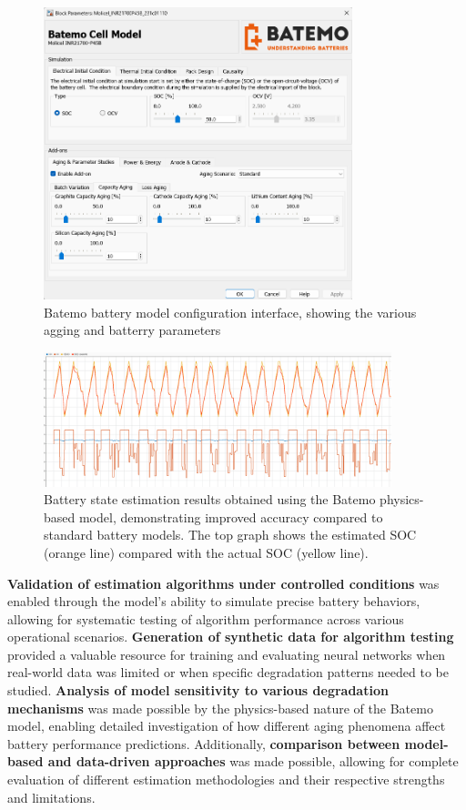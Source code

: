 \begin{figure}[htbp]
\centering
\includegraphics[width=0.8\textwidth]{imgs/batemo_configurations.png}
\caption{Batemo battery model configuration interface, showing the various agging and batterry parameters}
\label{fig:batemo_configurations}
\end{figure}

\begin{figure}[htbp]
\centering
\includegraphics[width=0.9\textwidth]{imgs/batemo_estimation.png}
\caption{Battery state estimation results obtained using the Batemo physics-based model, demonstrating improved accuracy compared to standard battery models. The top graph shows the estimated SOC (orange line) compared with the actual SOC (yellow line).}
\label{fig:batemo_estimation}
\end{figure}

\textbf{Validation of estimation algorithms under controlled conditions} was enabled through the model's ability to simulate precise battery behaviors, allowing for systematic testing of algorithm performance across various operational scenarios. \textbf{Generation of synthetic data for algorithm testing} provided a valuable resource for training and evaluating neural networks when real-world data was limited or when specific degradation patterns needed to be studied. \textbf{Analysis of model sensitivity to various degradation mechanisms} was made possible by the physics-based nature of the Batemo model, enabling detailed investigation of how different aging phenomena affect battery performance predictions. Additionally, \textbf{comparison between model-based and data-driven approaches} was made possible, allowing for complete evaluation of different estimation methodologies and their respective strengths and limitations.

